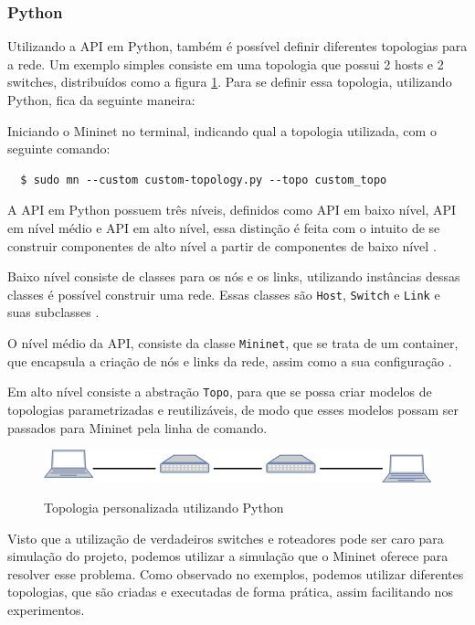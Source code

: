 \documentclass[
    12pt,
    openright, 
    oneside,
    a4paper,
    french,
    english,
    brazil
    ]{facom-ufu-abntex2}
\theoremstyle{definition}
\begin{document}
\subsubsection{Python}
Utilizando a API em Python, também é possível definir diferentes topologias para a rede. Um
exemplo simples consiste em uma topologia que possui 2 hosts e 2 switches, distribuídos como
a figura \ref{fig:custom-topology-example}. Para se definir essa topologia, utilizando
Python, fica da seguinte maneira:



Iniciando o Mininet no terminal, indicando qual a topologia utilizada, com o seguinte comando:

\begin{verbatim}
  $ sudo mn --custom custom-topology.py --topo custom_topo
\end{verbatim}

A API em Python possuem três níveis, definidos como API em baixo nível, API em nível médio e API
em alto nível, essa distinção é feita com o intuito de se construir componentes de alto nível
a partir de componentes de baixo nível \cite{mininetDocs}.

Baixo nível consiste de classes para os nós e os links, utilizando instâncias dessas 
classes é possível construir uma rede. Essas classes são \texttt{Host}, \texttt{Switch} e
\texttt{Link} e suas subclasses \cite{mininetDocs}.

O nível médio da API, consiste da classe \texttt{Mininet}, que se trata de um container,
que encapsula a criação de nós e links da rede, assim como a sua configuração \cite{mininetDocs}.

Em alto nível consiste a abstração \texttt{Topo}, para que se possa criar modelos de topologias 
parametrizadas e reutilizáveis, de modo que esses modelos possam ser passados para Mininet
pela linha de comando.

\begin{figure}[ht]
    \caption{Topologia personalizada utilizando Python}
    \centering
    \includegraphics[width=\textwidth]{images/2sw-2host.png}
    \label{fig:custom-topology-example}
\end{figure}

Visto que a utilização de verdadeiros switches e roteadores pode ser caro para simulação do
projeto, podemos utilizar a simulação que o Mininet oferece para resolver esse problema.
Como observado no exemplos, podemos utilizar diferentes topologias, que são criadas e 
executadas de forma prática, assim facilitando nos experimentos.
\end{document}
